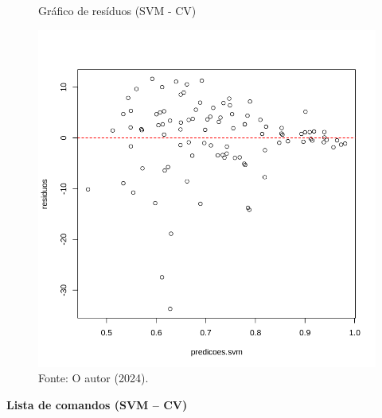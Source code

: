 \begin{figure}[H]
\centering
\caption{Gráfico de resíduos (SVM - CV)}
\includegraphics[width=.8\linewidth]{apendices/fig/8_IAA008_15.png}
\caption*{Fonte: O autor (2024).}
\end{figure}

\begin{center}
    \textbf{Lista de comandos (SVM – CV)}
\end{center}


